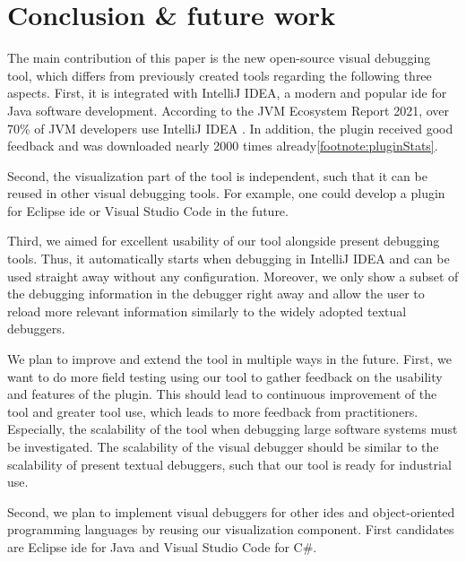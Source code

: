 \documentclass[conference]{IEEEtran}
\newcommand{\intellij}{IntelliJ IDEA}
\begin{document}
\section{Conclusion \& future work} \label{sec:conclusion}
The main contribution of this paper is the new open-source visual debugging tool, which differs from previously created tools regarding the following three aspects.
First, it is integrated with \intellij{}, a modern and popular \gls*{ide} for Java software development.
According to the JVM Ecosystem Report 2021, over 70\% of JVM developers use \intellij{}  \cite{JVMEcosystemReport2021}.
In addition, the plugin received good feedback and was downloaded nearly 2000 times already\cref{footnote:pluginStats}.

Second, the visualization part of the tool is independent, such that it can be reused in other visual debugging tools.
For example, one could develop a plugin for Eclipse \gls*{ide} or Visual Studio Code in the future.

Third, we aimed for excellent usability of our tool alongside present debugging tools.
Thus, it automatically starts when debugging in \intellij{} and can be used straight away without any configuration.
Moreover, we only show a subset of the debugging information in the debugger right away and allow the user to reload more relevant information similarly to the widely adopted textual debuggers.

We plan to improve and extend the tool in multiple ways in the future.
First, we want to do more field testing using our tool to gather feedback on the usability and features of the plugin.
This should lead to continuous improvement of the tool and greater tool use, which leads to more feedback from practitioners. 
Especially, the scalability of the tool when debugging large software systems must be investigated.
The scalability of the visual debugger should be similar to the scalability of present textual debuggers, such that our tool is ready for industrial use.

Second, we plan to implement visual debuggers for other \glspl*{ide} and object-oriented programming languages by reusing our visualization component.
First candidates are Eclipse \gls*{ide} for Java and Visual Studio Code for C\#.
\end{document}
